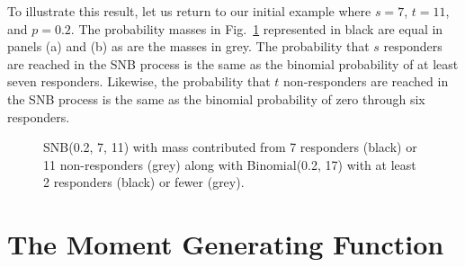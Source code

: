 \documentclass[review]{elsarticle}
\begin{document}
To illustrate this result, let us return to our initial example
where $s=7$, $t=11$, and $p=0.2$.  The probability masses in
Fig.~\ref{fig:snb_bin_compare} represented in 
black are equal in panels (a) and (b) as are the masses in grey.
The probability that $s$
responders are reached in the SNB process is the same as the binomial 
probability of at least seven responders. Likewise, the probability that $t$ 
non-responders are reached in the SNB process is the same as the binomial
probability of zero through six responders.

\begin{figure}[t!]
\centering
{}
\hfill
{}
\caption{
SNB(0.2, 7, 11) with mass contributed from 
7 responders (black) or 11 non-responders (grey) along with 
Binomial(0.2, 17) with at least 2 responders (black) or fewer (grey).
}
\label{fig:snb_bin_compare}
\end{figure}

\section{The Moment Generating Function}
\end{document}
